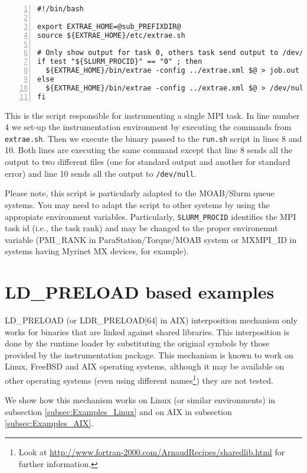 \begin{Verbatim}[frame=single,numbers=left,labelposition=topline,label=run.sh]
#!/bin/bash

export EXTRAE_HOME=@sub_PREFIXDIR@
source ${EXTRAE_HOME}/etc/extrae.sh

# Only show output for task 0, others task send output to /dev/null
if test "${SLURM_PROCID}" == "0" ; then
  ${EXTRAE_HOME}/bin/extrae -config ../extrae.xml $@ > job.out 2> job.err
else
  ${EXTRAE_HOME}/bin/extrae -config ../extrae.xml $@ > /dev/null 2> /dev/null
fi
\end{Verbatim}

This is the script responsible for instrumenting a single MPI task. In line number 4 we set-up the instrumentation environment by executing the commands from {\tt extrae.sh}. Then we execute the binary passed to the {\tt run.sh} script in lines 8 and 10. Both lines are executing the same command except that line 8 sends all the output to two different files (one for standard output and another for standard error) and line 10 sends all the output to {\tt /dev/null}.

Please note, this script is particularly adapted to the MOAB/Slurm queue systems. You may need to adapt the script to other systems by using the appropiate environment variables. Particularly, {\tt SLURM\_PROCID} identifies the MPI task id (i.e., the task rank) and may be changed to the proper environemnt variable (PMI\_RANK in ParaStation/Torque/MOAB system or MXMPI\_ID in systems having Myrinet MX devices, for example).

\section{LD\_PRELOAD based examples}\label{sec:Examples_LDPRELOAD}

LD\_PRELOAD (or LDR\_PRELOAD[64] in AIX) interposition mechanism only works for binaries that are linked against shared libraries. This interposition is done by the runtime loader by substituting the original symbols by those provided by the instrumentation package. This mechanism is known to work on Linux, FreeBSD and AIX operating systems, although it may be available on other operating systems (even using different names\footnote{Look at \url{http://www.fortran-2000.com/ArnaudRecipes/sharedlib.html} for further information.}) they are not tested.

We show how this mechanism works on Linux (or similar environments) in subsection \ref{subsec:Examples_Linux} and on AIX in subsection \ref{subsec:Examples_AIX}.

